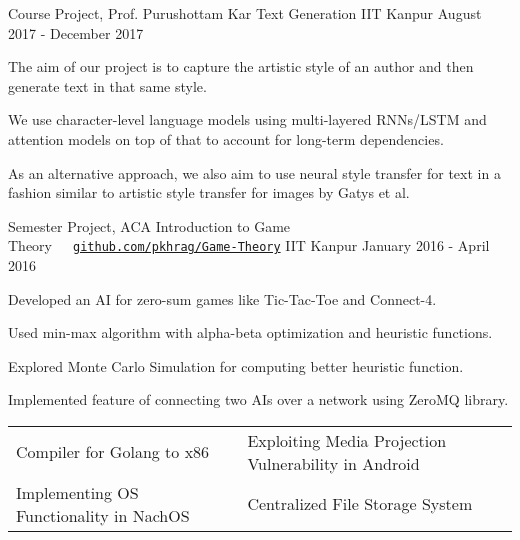 \documentclass[12pt, a4paper]{awesome-cv}
\begin{document}
\begin{cventries}
  \cventry
  {Course Project, Prof. Purushottam Kar}
  {Text Generation}
  {IIT Kanpur}
  {August 2017 - December 2017}
  {
      \begin{cvitems}
              \item The aim of our project is to capture the artistic style of an author and then generate text in that same style.
              \item We use character-level language models using multi-layered RNNs/LSTM and attention models on top of that to account for long-term dependencies.
              \item As an alternative approach, we also aim to use neural style transfer for text in a fashion similar to artistic style transfer for images by Gatys et al.
      \end{cvitems}
  }

  \cventry
    {Semester Project, ACA}
    {Introduction to Game Theory\ \ \   \texttt{\href{https://github.com/pkhrag/ACA-Project-Game-Theory}{github.com/pkhrag/Game-Theory}}}
    {IIT Kanpur}	
    {January 2016 - April 2016}
    {
      \begin{cvitems}
    	\item Developed an AI for zero-sum games like Tic-Tac-Toe and Connect-4.
    	\item Used min-max algorithm with alpha-beta optimization and heuristic functions.
        \item Explored Monte Carlo Simulation for computing better heuristic function.
    	\item Implemented feature of connecting two AIs over a network using ZeroMQ library.
      \end{cvitems}
    }

\end{cventries}
\vspace{-0.3cm}
{\fontsize{12pt}{1em}\bodyfontlight\upshape\color{text}
\begin{tabular}{l l}
 Compiler for Golang to x86& Exploiting Media Projection Vulnerability in Android\\
    Implementing OS Functionality in NachOS & Centralized File Storage System\\ 
 
 \end{tabular}
 }
\vspace{-0.3cm}
\end{document}
